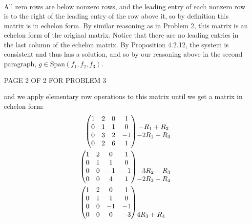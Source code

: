 \documentclass[12pt]{article}
\newenvironment{problem}[2][Problem]
{
	\begin{trivlist} 
		\item[\hskip \labelsep {\bfseries #1 #2:}]
	}
{
	\end{trivlist}
	}
\begin{document}
\begin{problem}{6}
\begin{align*}
\end{align*}
All zero rows are below nonzero rows, and the leading entry of each nonzero row is to the right of the leading entry of the row above it, so by definition this matrix is in echelon form. By similar reasoning as in Problem 2, this matrix is an echelon form of the original matrix. Notice that there are no leading entries in the last column of the echelon matrix. By Proposition 4.2.12, the system is consistent and thus has a solution, and so by our reasoning above in the second paragraph, $g\in \text{Span}(f_1,f_2,f_3)$.
\vfill
\centerline{PAGE 2 OF 2 FOR PROBLEM 3}
%
%
%
\newpage
and we apply elementary row operations to this matrix until we get a matrix in echelon form:
\begin{align*}
\begin{pmatrix}1&2&0&1\\0&1&1&0\\0&3&2&-1\\0&2&6&1\end{pmatrix}
&\begin{matrix}\hphantom{1}\\-R_1+R_2\hphantom{1}\\-2R_1+R_3\hphantom{1}\\\hphantom{1}\end{matrix}\\
\begin{pmatrix}1&2&0&1\\0&1&1&0\\0&0&-1&-1\\0&0&4&1\end{pmatrix}
&\begin{matrix}\hphantom{1}\\\hphantom{1}\\-3R_2+R_3\hphantom{1}\\-2R_2+R_4\hphantom{1}\end{matrix}\\
\begin{pmatrix}1&2&0&1\\0&1&1&0\\0&0&-1&-1\\0&0&0&-3\end{pmatrix}
&\begin{matrix}\hphantom{1}\\\hphantom{1}\\\hphantom{1}\\4R_3+R_4\hphantom{1}\end{matrix}\\
\end{align*}

\end{problem}
\end{document}
